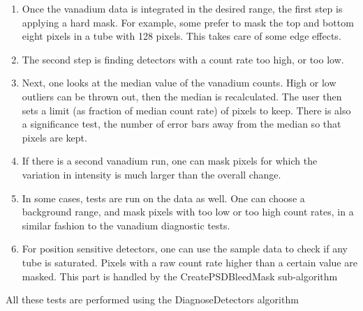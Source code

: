 \begin{enumerate}
\item Once the vanadium data is integrated in the desired range, the first step is applying a hard mask. For example, some prefer to mask the top and bottom eight pixels in a tube with 128 pixels. This takes care of some edge effects.
\item The second step is finding detectors with a count rate too high, or too low.
\item Next, one looks at the median value of the vanadium counts. High or low outliers can be thrown out, then the median is recalculated. The user then sets a limit (as fraction of median count rate) of pixels to keep. There is also a significance test, the number of error bars away from the median so that pixels are kept. 
\item If there is a second vanadium run, one can mask pixels for which the variation in intensity is much larger than the overall change.
\item In some cases, tests are run on the data as well. One can choose a background range, and mask pixels with too low or too high count rates, in a similar fashion to the vanadium diagnostic tests.
\item For position sensitive detectors, one can use the sample data to check if any tube is saturated. Pixels with a raw count rate higher than a certain value are masked. This part is handled by the CreatePSDBleedMask sub-algorithm 
\end{enumerate}

All these tests are performed using the DiagnoseDetectors algorithm

